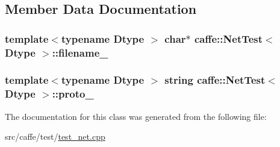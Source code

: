 \subsection{Member Data Documentation}
\hypertarget{classcaffe_1_1_net_test_a8f238f38de09434b238b3bd3b518ad55}{
\subsubsection[{filename\+\_\+}]{\setlength{\rightskip}{0pt plus 5cm}template$<$typename Dtype $>$ char$\ast$ {\bf caffe\+::\+Net\+Test}$<$ Dtype $>$\+::filename\+\_\+\hspace{0.3cm}{\ttfamily [protected]}}}\label{classcaffe_1_1_net_test_a8f238f38de09434b238b3bd3b518ad55}
\hypertarget{classcaffe_1_1_net_test_ab797d941c20a3aa3beb52e1b190f01dd}{
\subsubsection[{proto\+\_\+}]{\setlength{\rightskip}{0pt plus 5cm}template$<$typename Dtype $>$ string {\bf caffe\+::\+Net\+Test}$<$ Dtype $>$\+::proto\+\_\+\hspace{0.3cm}{\ttfamily [protected]}}}\label{classcaffe_1_1_net_test_ab797d941c20a3aa3beb52e1b190f01dd}


The documentation for this class was generated from the following file\+:\begin{DoxyCompactItemize}
\item 
src/caffe/test/\hyperlink{test__net_8cpp}{test\+\_\+net.\+cpp}\end{DoxyCompactItemize}
